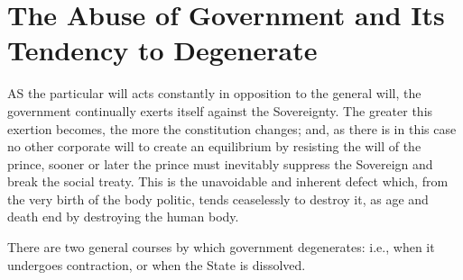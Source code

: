\documentclass[12pt]{book}
\begin{document}
\section{The Abuse of Government and Its Tendency to Degenerate}
AS the particular will acts constantly in opposition to the general will, the government continually exerts itself against the Sovereignty. The greater this exertion becomes, the more the constitution changes; and, as there is in this case no other corporate will to create an equilibrium by resisting the will of the prince, sooner or later the prince must inevitably suppress the Sovereign and break the social treaty. This is the unavoidable and inherent defect which, from the very birth of the body politic, tends ceaselessly to destroy it, as age and death end by destroying the human body.

There are two general courses by which government degenerates: i.e., when it undergoes contraction, or when the State is dissolved.
\end{document}
